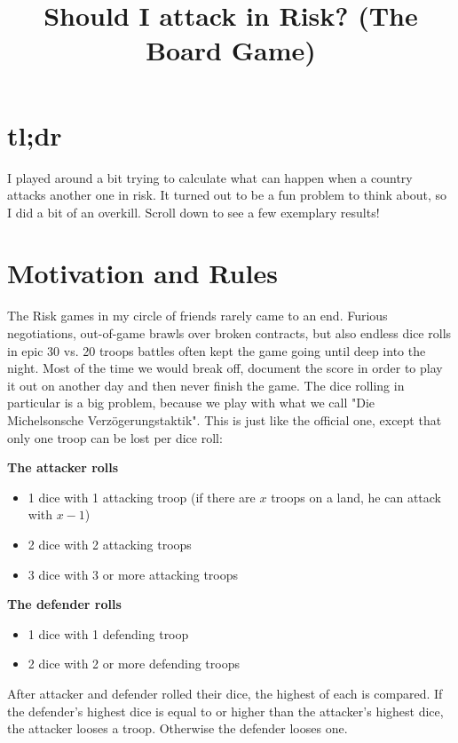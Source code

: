 \documentclass[11pt,a4paper]{article}
\title{Should I attack in Risk? (The Board Game)}
\author{}
\date{}
\begin{document}
    \maketitle


    \section*{tl;dr}
    I played around a bit trying to calculate what can happen when a country attacks another one in risk.
    It turned out to be a fun problem to think about, so I did a bit of an overkill.
    Scroll down to see a few exemplary results!


    \section{Motivation and Rules}
    The Risk games in my circle of friends rarely came to an end.
    Furious negotiations, out-of-game brawls over broken contracts, but also endless dice rolls in epic 30 vs. 20 troops battles often kept the game going until deep into the night.
    Most of the time we would break off, document the score in order to play it out on another day and then never finish the game.
    The dice rolling in particular is a big problem, because we play with what we call "Die Michelsonsche Verzögerungstaktik".
    This is just like the official one, except that only one troop can be lost per dice roll:

    \textbf{The attacker rolls}
    \begin{itemize}
        \item 1 dice with 1 attacking troop (if there are $x$ troops on a land, he can attack with $x-1$)
        \item 2 dice with 2 attacking troops
        \item 3 dice with 3 or more attacking troops
    \end{itemize}

    \textbf{The defender rolls}
    \begin{itemize}
        \item 1 dice with 1 defending troop
        \item 2 dice with 2 or more defending troops
    \end{itemize}

    After attacker and defender rolled their dice, the highest of each is compared.
    If the defender's highest dice is equal to or higher than the attacker's highest dice, the attacker looses a troop.
    Otherwise the defender looses one.
\end{document}
